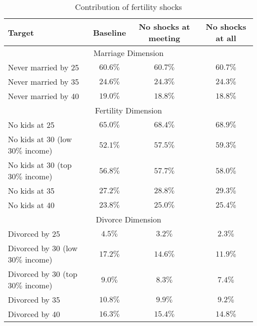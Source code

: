 \documentclass[12pt,letter]{article}
\begin{document}
\begin{table}
\begin{center}
\begin{tabular}{|l|c|c|c|}\hline
Target & Baseline & No shocks at meeting & No shocks at all \\\hline
\multicolumn{4}{|c|}{Marriage Dimension} \\\hline
Never married by 25  & $60.6\%$ & $60.7\%$ & $60.7\%$  \\
Never married by 35 & $24.6\%$ & $24.3\%$ & $24.3\%$  \\
Never married by 40 & $19.0\%$ & $18.8\%$ & $18.8\%$  \\\hline
\multicolumn{4}{|c|}{Fertility Dimension} \\\hline
No kids at 25 & $65.0\%$ & $68.4\%$ & $68.9\%$ \\
No kids at 30 (low $30\%$ income) & $52.1\%$  &   $57.5\%$ & $59.3\%$ \\
No kids at 30 (top $30\%$ income) & $56.8\%$  &   $57.7\%$ & $58.0\%$ \\
No kids at 35  & $27.2\%$ &   $28.8\%$ & $29.3\%$ \\
No kids at 40 & $23.8\%$  &  $25.0\%$  & $25.4\%$ \\\hline
\multicolumn{4}{|c|}{Divorce Dimension} \\\hline
Divorced by 25 & $4.5\%$   &  $3.2\%$ & $2.3\%$ \\
Divorced by 30 (low $30\%$ income)  & $17.2\%$  &     $14.6\%$ & $11.9\%$ \\
Divorced by 30 (top $30\%$ income)  & $9.0\%$ &     $8.3\%$  & $7.4\%$ \\
Divorced by 35  & $10.8\%$  &   $9.9\%$ & $9.2\%$  \\
Divorced by 40  & $16.3\%$ &  $15.4\%$ & $14.8\%$ \\\hline
\end{tabular}
\caption{Contribution of fertility shocks \label{cf-shocks}}
\end{center}
\end{table}
\end{document}
